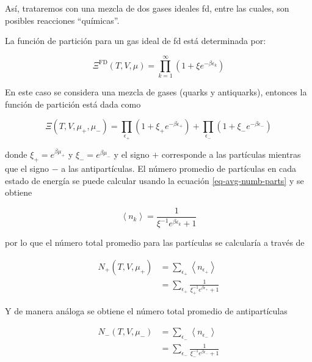Así, trataremos con una mezcla de dos gases ideales \acrshort{fd}, entre las cuales, son posibles reacciones ``químicas''.

La función de partición para un gas ideal de \acrshort{fd}  está determinada por:

\begin{equation}
{\Xi}^{\mathrm{FD}}(T,V,\mu)=\prod_{k=1}^{\infty} \left(1 + \xi {e}^{-\beta {\epsilon}_{k}} \right)
\end{equation}

En este caso se considera una mezcla de gases (quarks y antiquarks), entonces la función de partición está dada como

\begin{equation}
\Xi\left(T,V,{\mu}_{+},{\mu}_{-}\right) = \prod_{{\epsilon}_{+}} \left(1+ {\xi}_{+}{e}^{-\beta {\epsilon}_{+}} \right) + \prod_{{\epsilon}_{-}} \left(1+ {\xi}_{-}{e}^{-\beta {\epsilon}_{-}} \right)
\end{equation}

donde ${\xi}_{+} = {e}^{\beta {\mu}_{+}}$ y ${\xi}_{-} = {e}^{\beta{\mu}_{-}}$ y el signo $+$ corresponde a las partículas mientras que el signo $-$ a las antipartículas. El número promedio de partículas en cada estado de energía se puede calcular usando la ecuación \eqref{eq-avg-numb-parts} y se obtiene

\begin{equation}\label{eq-FD-NumbParts}
\left\langle{n}_{k} \right\rangle = \frac{1}{{\xi}^{-1}{e}^{\beta{\epsilon}_{k}} + 1}
\end{equation}

por lo que el número total promedio para las partículas se calcularía a través de

\begin{equation}\label{eq-FD-Tot-Numb-Parts}
\begin{split}
{N}_{+}(T,V,{\mu}_{+}) &= \sum_{{\epsilon}_{+}} \left\langle{n}_{{\epsilon}_{+}} \right\rangle\\
& = \sum_{{\epsilon}_{+}} \frac{1}{{\xi}_{+}^{-1}{e}^{\beta{{\epsilon}}_{+}} + 1}
\end{split}
\end{equation}

Y de manera análoga se obtiene el número total promedio de antipartículas

\begin{equation}\label{eq-FD-Tot-Numb-Antiparts}
\begin{split}
{N}_{-}(T,V,{\mu}_{-}) &= \sum_{{\epsilon}_{-}} \left\langle{n}_{{\epsilon}_{-}} \right\rangle\\
& = \sum_{{\epsilon}_{-}} \frac{1}{{\xi}_{-}^{-1}{e}^{\beta{{\epsilon}}_{-}} + 1}
\end{split}
\end{equation}

